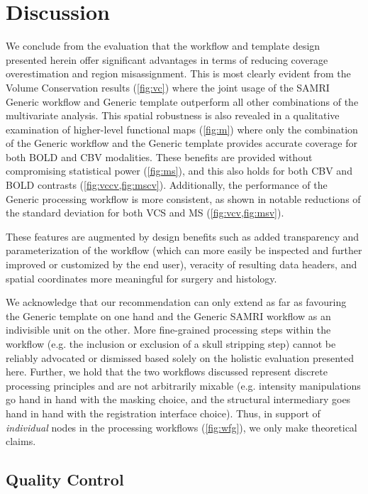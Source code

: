 \section{Discussion}

We conclude from the evaluation that the workflow and template design presented herein offer significant advantages in terms of reducing coverage overestimation and region misassignment.
This is most clearly evident from the Volume Conservation results (\cref{fig:vc}) where the joint usage of the SAMRI Generic workflow and Generic template outperform all other combinations of the multivariate analysis.
This spatial robustness is also revealed in a qualitative examination of higher-level functional maps (\cref{fig:m}) where only the combination of the Generic workflow and the Generic template provides accurate coverage for both BOLD and CBV modalities.
These benefits are provided without compromising statistical power (\cref{fig:ms}), and this also holds for both CBV and BOLD contrasts (\cref{fig:vccv,fig:mscv}).
Additionally, the performance of the Generic processing workflow is more consistent, as shown in notable reductions of the standard deviation for both VCS and MS (\cref{fig:vcv,fig:msv}).

These features are augmented by design benefits such as added transparency and parameterization of the workflow (which can more easily be inspected and further improved or customized by the end user), veracity of resulting data headers, and spatial coordinates more meaningful for surgery and histology.

We acknowledge that our recommendation can only extend as far as favouring the Generic template on one hand and the Generic SAMRI workflow as an indivisible unit on the other.
More fine-grained processing steps within the workflow (e.g. the inclusion or exclusion of a skull stripping step) cannot be reliably advocated or dismissed based solely on the holistic evaluation presented here.
Further, we hold that the two workflows discussed represent discrete processing principles and are not arbitrarily mixable (e.g. intensity manipulations go hand in hand with the masking choice, and the structural intermediary goes hand in hand with the registration interface choice).
Thus, in support of \textit{individual} nodes in the processing workflows (\cref{fig:wfg}), we only make theoretical claims.

\subsection{Quality Control}

